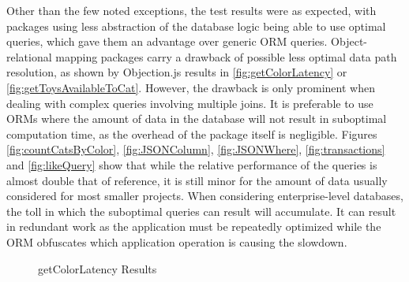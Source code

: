 Other than the few noted exceptions, the test results were as expected, with
packages using less abstraction of the database logic being able to use optimal
queries, which gave them an advantage over generic ORM queries.
Object-relational mapping packages carry a drawback of possible less optimal
data path resolution, as shown by Objection.js results in
\autoref{fig:getColorLatency} or \autoref{fig:getToysAvailableToCat}. However,
the drawback is only prominent when dealing with complex queries involving
multiple joins. It is preferable to use ORMs where the amount of data in the
database will not result in suboptimal computation time, as the overhead of the
package itself is negligible. Figures \ref{fig:countCatsByColor},
\ref{fig:JSONColumn}, \ref{fig:JSONWhere}, \ref{fig:transactions} and
\ref{fig:likeQuery} show that while the relative performance of the queries is
almost double that of reference, it is still minor for the amount of data
usually considered for most smaller projects. When considering enterprise-level
databases, the toll in which the suboptimal queries can result will accumulate.
It can result in redundant work as the application must be repeatedly optimized
while the ORM obfuscates which application operation is causing the slowdown. 


\begin{figure}
  \caption{getColorLatency Results}
  \label{fig:getColorLatency}
\end{figure}

